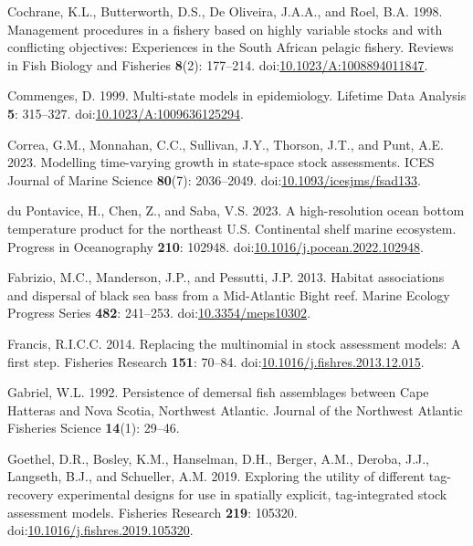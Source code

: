 \documentclass[
]{article}
\newlength{\cslhangindent}
\newlength{\cslentryspacingunit} %
\newenvironment{CSLReferences}[2] %
 {%
  \setlength{\parindent}{0pt}
  \ifodd #1
  \let\oldpar\par
  \def\par{\hangindent=\cslhangindent\oldpar}
  \fi
  \setlength{\parskip}{#2\cslentryspacingunit}
 }%
 {}
\begin{document}
\begin{CSLReferences}{1}{0}
\leavevmode{}%
Cochrane, K.L., Butterworth, D.S., De Oliveira, J.A.A., and Roel, B.A. 1998. Management procedures in a fishery based on highly variable stocks and with conflicting objectives: Experiences in the {S}outh {A}frican pelagic fishery. Reviews in Fish Biology and Fisheries \textbf{8}(2): 177--214. doi:\href{https://doi.org/10.1023/A:1008894011847}{10.1023/A:1008894011847}.

\leavevmode{}%
Commenges, D. 1999. Multi-state models in epidemiology. Lifetime Data Analysis \textbf{5}: 315--327. doi:\href{https://doi.org/10.1023/A:1009636125294}{10.1023/A:1009636125294}.

\leavevmode{}%
Correa, G.M., Monnahan, C.C., Sullivan, J.Y., Thorson, J.T., and Punt, A.E. 2023. Modelling time-varying growth in state-space stock assessments. ICES Journal of Marine Science \textbf{80}(7): 2036--2049. doi:\href{https://doi.org/10.1093/icesjms/fsad133}{10.1093/icesjms/fsad133}.

\leavevmode{}%
du Pontavice, H., Chen, Z., and Saba, V.S. 2023. A high-resolution ocean bottom temperature product for the northeast {U}.{S}. Continental shelf marine ecosystem. Progress in Oceanography \textbf{210}: 102948. doi:\href{https://doi.org/10.1016/j.pocean.2022.102948}{10.1016/j.pocean.2022.102948}.

\leavevmode{}%
Fabrizio, M.C., Manderson, J.P., and Pessutti, J.P. 2013. Habitat associations and dispersal of black sea bass from a {M}id-{A}tlantic {B}ight reef. Marine Ecology Progress Series \textbf{482}: 241--253. doi:\href{https://doi.org/10.3354/meps10302}{10.3354/meps10302}.

\leavevmode{}%
Francis, R.I.C.C. 2014. Replacing the multinomial in stock assessment models: A first step. Fisheries Research \textbf{151}: 70--84. doi:\href{https://doi.org/10.1016/j.fishres.2013.12.015}{10.1016/j.fishres.2013.12.015}.

\leavevmode{}%
Gabriel, W.L. 1992. Persistence of demersal fish assemblages between {C}ape {H}atteras and {N}ova {S}cotia, {N}orthwest {A}tlantic. Journal of the Northwest Atlantic Fisheries Science \textbf{14}(1): 29--46.

\leavevmode{}%
Goethel, D.R., Bosley, K.M., Hanselman, D.H., Berger, A.M., Deroba, J.J., Langseth, B.J., and Schueller, A.M. 2019. Exploring the utility of different tag-recovery experimental designs for use in spatially explicit, tag-integrated stock assessment models. Fisheries Research \textbf{219}: 105320. doi:\href{https://doi.org/10.1016/j.fishres.2019.105320}{10.1016/j.fishres.2019.105320}.


\end{CSLReferences}
\end{document}
